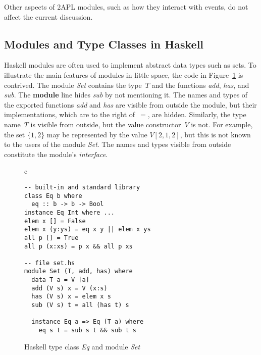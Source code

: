 \documentclass[conference,compsoc]{IEEEtran} %
\begin{document}
Other aspects of 2APL modules, such as how they interact with 
events, do not affect the current discussion.

\subsection{Modules and Type Classes in Haskell} %


Haskell modules are often used to implement abstract data types such as
sets.  To illustrate the main features of modules in little space, the code
in Figure~\ref{fig:haskell} is contrived.  The module \textit{Set} contains
the type~$T$ and the functions \textit{add}, \textit{has}, and
\textit{sub}. The \textbf{module} line hides \textit{sub} by not mentioning
it. The names and types of the exported functions \textit{add} and
\textit{has} are visible from outside the module, but their
implementations, which are to the right of~$=$, are hidden.  Similarly, the
type name~$T$ is visible from outside, but the value constructor~$V$ is
not. For example, the set $\{1,2\}$ may be represented by the value
$V[2,1,2]$, but this is not known to the users of the module \textit{Set}.
The names and types visible from outside constitute the module's
\emph{interface}.

\begin{figure}\footnotesize %
\begin{center}
\begin{tabular}{c}
\begin{lstlisting}[style=hs]
-- built-in and standard library
class Eq b where
  eq :: b -> b -> Bool
instance Eq Int where ...
elem x [] = False
elem x (y:ys) = eq x y || elem x ys
all p [] = True
all p (x:xs) = p x && all p xs

-- file set.hs
module Set (T, add, has) where
  data T a = V [a]
  add (V s) x = V (x:s)
  has (V s) x = elem x s
  sub (V s) t = all (has t) s

  instance Eq a => Eq (T a) where
    eq s t = sub s t && sub t s
\end{lstlisting}
\end{tabular}
\end{center}
\caption{Haskell type class \textit{Eq} and module \textit{Set}}
\label{fig:haskell}
\end{figure} %
\end{document}
